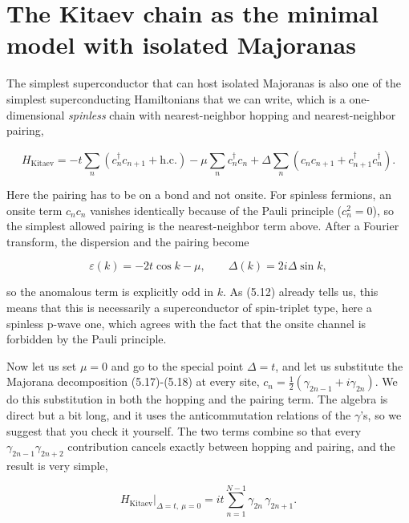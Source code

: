 \section{The Kitaev chain as the minimal model with isolated Majoranas}

The simplest superconductor that can host isolated Majoranas is also one of the simplest
superconducting Hamiltonians that we can write, which is a one-dimensional \emph{spinless} chain
with nearest-neighbor hopping and nearest-neighbor pairing,

\begin{equation}
H_{\text{Kitaev}} = -t\sum_n \left(c_n^\dagger c_{n+1} + \text{h.c.}\right) - \mu\sum_n c_n^\dagger c_n + \Delta\sum_n \left(c_n c_{n+1} + c_{n+1}^\dagger c_n^\dagger\right).
\end{equation}

Here the pairing has to be on a bond and not onsite. For spinless fermions, an onsite term $c_n c_n$
vanishes identically because of the Pauli principle ($c_n^2=0$), so the simplest allowed pairing is
the nearest-neighbor term above. After a Fourier transform, the dispersion and the pairing become

\begin{equation}
\varepsilon(k) = -2t\cos k - \mu, \qquad \Delta(k) = 2i\Delta\sin k,
\end{equation}

so the anomalous term is explicitly odd in $k$. As (5.12) already tells us, this means that this is
necessarily a superconductor of spin-triplet type, here a spinless p-wave one, which agrees with the
fact that the onsite channel is forbidden by the Pauli principle.

Now let us set $\mu=0$ and go to the special point $\Delta=t$, and let us substitute the Majorana
decomposition (5.17)-(5.18) at every site, $c_n = \frac{1}{2}(\gamma_{2n-1}+i\gamma_{2n})$. We do
this substitution in both the hopping and the pairing term. The algebra is direct but a bit long,
and it uses the anticommutation relations of the $\gamma$'s, so we suggest that you check it
yourself. The two terms combine so that every $\gamma_{2n-1}\gamma_{2n+2}$ contribution cancels
exactly between hopping and pairing, and the result is very simple,

\begin{equation}
H_{\text{Kitaev}}\Big|_{\Delta=t,\ \mu=0} = it\sum_{n=1}^{N-1} \gamma_{2n}\,\gamma_{2n+1}.
\end{equation}

